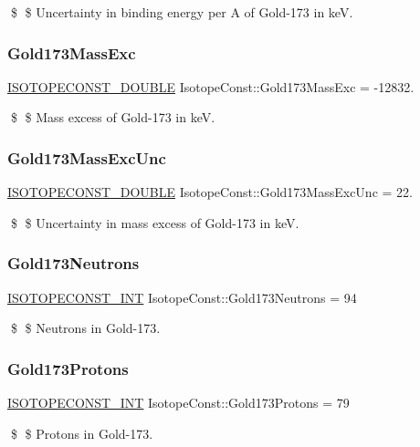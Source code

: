 \$ \$ Uncertainty in binding energy per A of Gold-\/173 in keV. \mbox{\label{group___isotope_const-_gold-_au173_ga6538827d09643f2ac15031f0d418cdc0}} 
\subsubsection{\texorpdfstring{Gold173\+Mass\+Exc}{Gold173MassExc}}
{\footnotesize\ttfamily \mbox{\hyperlink{group___isotope_const-_macros_ga8f45a7272ce02c0b4c65c44636ed719a}{I\+S\+O\+T\+O\+P\+E\+C\+O\+N\+S\+T\+\_\+\+D\+O\+U\+B\+LE}} Isotope\+Const\+::\+Gold173\+Mass\+Exc = -\/12832.}

\$ \$ Mass excess of Gold-\/173 in keV. \mbox{\label{group___isotope_const-_gold-_au173_ga58fd5410950519f232f901dc3f74b40c}} 
\subsubsection{\texorpdfstring{Gold173\+Mass\+Exc\+Unc}{Gold173MassExcUnc}}
{\footnotesize\ttfamily \mbox{\hyperlink{group___isotope_const-_macros_ga8f45a7272ce02c0b4c65c44636ed719a}{I\+S\+O\+T\+O\+P\+E\+C\+O\+N\+S\+T\+\_\+\+D\+O\+U\+B\+LE}} Isotope\+Const\+::\+Gold173\+Mass\+Exc\+Unc = 22.}

\$ \$ Uncertainty in mass excess of Gold-\/173 in keV. \mbox{\label{group___isotope_const-_gold-_au173_ga07ae3dfb25bc518b411d72df65059d9e}} 
\subsubsection{\texorpdfstring{Gold173\+Neutrons}{Gold173Neutrons}}
{\footnotesize\ttfamily \mbox{\hyperlink{group___isotope_const-_macros_ga5f18360b3e99483a35c32d789e62621c}{I\+S\+O\+T\+O\+P\+E\+C\+O\+N\+S\+T\+\_\+\+I\+NT}} Isotope\+Const\+::\+Gold173\+Neutrons = 94}

\$ \$ Neutrons in Gold-\/173. \mbox{\label{group___isotope_const-_gold-_au173_ga921ffc79975ab655b1b2c88eebb62565}} 
\subsubsection{\texorpdfstring{Gold173\+Protons}{Gold173Protons}}
{\footnotesize\ttfamily \mbox{\hyperlink{group___isotope_const-_macros_ga5f18360b3e99483a35c32d789e62621c}{I\+S\+O\+T\+O\+P\+E\+C\+O\+N\+S\+T\+\_\+\+I\+NT}} Isotope\+Const\+::\+Gold173\+Protons = 79}

\$ \$ Protons in Gold-\/173. 